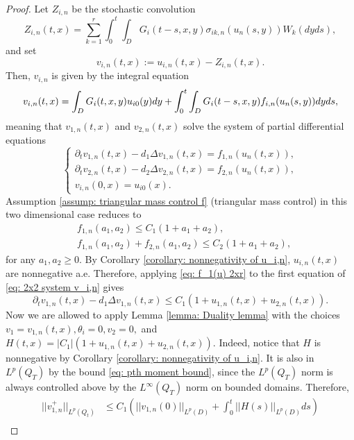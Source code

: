 \documentclass[12pt]{article}
\theoremstyle{definition}
\theoremstyle{remark}
\begin{document}
\begin{proof}
Let $Z_{i,n}$ be the stochastic convolution
\begin{equation}\label{eq: truncated stochastic conv}
Z_{i,n}(t,x) = \sum_{k=1}^r \int_0^t\int_{D} G_{i}(t-s,x,y)\sigma_{ik,n}(u_n(s,y))W_k(dyds),
\end{equation}
and set 
\[
v_{i,n}(t,x) := u_{i,n}(t,x) - Z_{i,n}(t,x).
\]
Then, $v_{i,n}$ is given by the integral equation
\begin{equation}\label{eq: v_{i,n} mild form}
v_{i,n}(t,x) = \int_D G_{i}(t,x,y)u_{i0}(y)dy + \int_0^t\int_{D} G_{i}(t-s,x,y)f_{i,n}(u_n(s,y))dyds,
\end{equation}
meaning that $v_{1,n}(t,x)$ and $v_{2,n}(t,x)$ solve the system of partial differential equations
\begin{equation}\label{eq: 2x2 system v_i,n}
\begin{cases}
    \partial_t v_{1,n}(t,x)- d_1\Delta v_{1,n}(t,x) = f_{1,n}(u_n(t,x)),\\
    \partial_t v_{2,n}(t,x) - d_2\Delta v_{2,n}(t,x) = f_{2,n}(u_n(t,x)),\\
    v_{i,n}(0,x) = u_{i0}(x).
\end{cases}
\end{equation}
Assumption \ref{assump: triangular mass control f} (triangular mass control) in this two dimensional case reduces to
\begin{align}
    &f_{1,n}(a_1,a_2) \leq C_1(1+a_1+a_2), \label{eq: f_1(u) 2xr}\\
    &f_{1,n}(a_1,a_2)+f_{2,n}(a_1,a_2) \leq C_2(1+a_1+a_2),\label{eq: f_1(u)+f_2(u) 2xr}
\end{align}
for any $a_1,a_2\geq 0$. By Corollary \ref{corollary: nonnegativity of u_i,n}, $u_{i,n}(t,x)$ are nonnegative a.e. Therefore, applying \eqref{eq: f_1(u) 2xr} to the first equation of \eqref{eq: 2x2 system v_i,n} gives
\[
\partial_t v_{1,n}(t,x)- d_1\Delta v_{1,n}(t,x) \leq C_1(1+u_{1,n}(t,x)+u_{2,n}(t,x)).
\]
Now we are allowed to apply Lemma \ref{lemma: Duality lemma} with the choices $v_1=v_{1,n}(t,x),\theta_i = 0,v_2=0,$ and $H(t,x)=|C_1|(1+u_{1,n}(t,x)+u_{2,n}(t,x)).$
Indeed, notice that $H$ is nonnegative by Corollary \ref{corollary: nonnegativity of u_i,n}. It is also in $L^p(Q_T)$ by the bound \eqref{eq: pth moment bound}, since the $L^p(Q_T)$ norm is always controlled above by the $L^\infty(Q_T)$ norm on bounded domains. Therefore,
\begin{align*}
||v_{1,n}^{+}||_{L^p(Q_t)} &\leq C_1\left(||v_{1,n}(0)||_{L^p(D)}+ \int_0^t ||H(s)||_{L^p(D)}ds\right)\\

\end{align*}
\end{proof}
\end{document}
